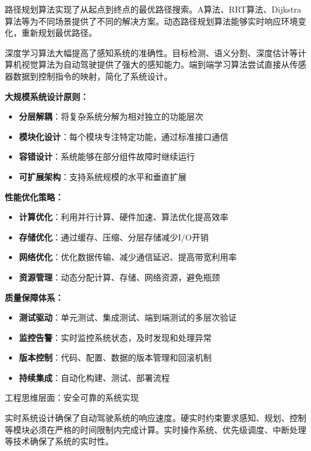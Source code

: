 路径规划算法实现了从起点到终点的最优路径搜索。A算法、RRT算法、Dijkstra算法等为不同场景提供了不同的解决方案。动态路径规划算法能够实时响应环境变化，重新规划最优路径。

深度学习算法大幅提高了感知系统的准确性。目标检测、语义分割、深度估计等计算机视觉算法为自动驾驶提供了强大的感知能力。端到端学习算法尝试直接从传感器数据到控制指令的映射，简化了系统设计。

\begin{tcolorbox}[colback=green!5!white,colframe=green!75!black,title=方法要点：工程实现的系统性方法]
\textbf{大规模系统设计原则：}
\begin{itemize}
\item \textbf{分层解耦}：将复杂系统分解为相对独立的功能层次
\item \textbf{模块化设计}：每个模块专注特定功能，通过标准接口通信
\item \textbf{容错设计}：系统能够在部分组件故障时继续运行
\item \textbf{可扩展架构}：支持系统规模的水平和垂直扩展
\end{itemize}

\textbf{性能优化策略：}
\begin{itemize}
\item \textbf{计算优化}：利用并行计算、硬件加速、算法优化提高效率
\item \textbf{存储优化}：通过缓存、压缩、分层存储减少I/O开销
\item \textbf{网络优化}：优化数据传输、减少通信延迟、提高带宽利用率
\item \textbf{资源管理}：动态分配计算、存储、网络资源，避免瓶颈
\end{itemize}

\textbf{质量保障体系：}
\begin{itemize}
\item \textbf{测试驱动}：单元测试、集成测试、端到端测试的多层次验证
\item \textbf{监控告警}：实时监控系统状态，及时发现和处理异常
\item \textbf{版本控制}：代码、配置、数据的版本管理和回滚机制
\item \textbf{持续集成}：自动化构建、测试、部署流程
\end{itemize}
\end{tcolorbox}

工程思维层面：安全可靠的系统实现

实时系统设计确保了自动驾驶系统的响应速度。硬实时约束要求感知、规划、控制等模块必须在严格的时间限制内完成计算。实时操作系统、优先级调度、中断处理等技术确保了系统的实时性。

